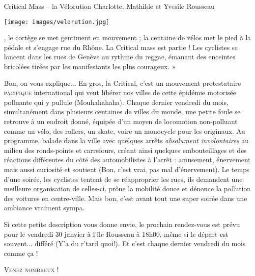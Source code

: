 \ligne



\vspace*{-4mm}
\begin{article}{Critical Mass -- la Vélorution}
{Charlotte, Mathilde et Yves}{île Rousseau}

\texttt{[image: images/velorution.jpg]}

\vspace*{2mm}
, le cortège se met gentiment en mouvement ; la centaine de vélos met le pied à la pédale et s'engage rue du Rhône. La Critical mass est partie ! Les cyclistes se lancent dans les rues de Genève au rythme du reggae, émanant des enceintes bricolées tirées par les manifestants les plus courageux. »

Bon, on vous explique... En gros, la Critical, c'est un mouvement protestataire \textsc{pacifique} international qui veut libérer nos villes de cette épidémie motorisée polluante qui y pullule (Mouhahahaha). Chaque dernier vendredi du mois, simultanément dans plusieurs centaines de villes du monde, une petite foule se retrouve à un endroit donné, équipée d'un moyen de locomotion non-polluant comme un vélo, des rollers, un skate, voire un monocycle pour les originaux. Au programme, balade dans la ville avec quelques arrêts \textit{absolument involontaires} au milieu des ronds-points et carrefours, créant ainsi quelques embouteillages et des réactions différentes du côté des automobilistes à l'arrêt : amusement, énervement mais aussi curiosité et soutient (Bon, c'est vrai, pas mal d'énervement). Le temps d'une soirée, les cyclistes tentent de se réapproprier les rues, ils demandent une meilleure organisation de celles-ci, prône la mobilité douce et dénonce la pollution des voitures en centre-ville. Mais bon, c'est avant tout une super soirée dans une ambiance vraiment sympa.

Si cette petite description vous donne envie, le prochain rendez-vous est prévu pour le vendredi 30 janvier à l'île Rousseau à 18h00, même si le départ est souvent... différé (Y'a du r'tard quoi!). Et c'est chaque dernier vendredi du mois comme ça !

\textsc{Venez nombreux !}


{}
\end{article}

